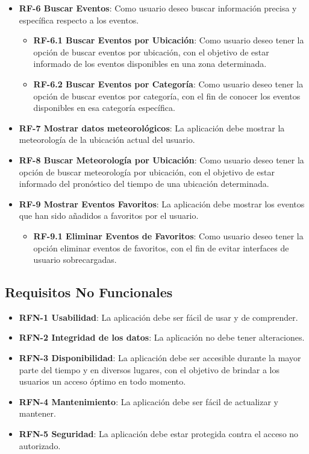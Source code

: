 \begin{itemize}
    \item \textbf{RF-6 Buscar Eventos}: Como usuario deseo buscar información precisa y específica respecto a los eventos.
    \begin{itemize}
        \item  \textbf{RF-6.1 Buscar Eventos por Ubicación}: Como usuario deseo tener la opción de buscar eventos por ubicación, con el objetivo de estar informado de los eventos disponibles en una zona determinada.
        \item  \textbf{RF-6.2 Buscar Eventos por Categoría}: Como usuario deseo tener la opción de buscar eventos por categoría, con el fin de conocer los eventos disponibles en esa categoría específica.
    \end{itemize}
    
    \item \textbf{RF-7 Mostrar datos meteorológicos}: La aplicación debe mostrar la meteorología de la ubicación actual del usuario.
    \item \textbf{RF-8 Buscar Meteorología por Ubicación}: Como usuario deseo tener la opción de buscar meteorología por ubicación, con el objetivo de estar informado del pronóstico del tiempo de una ubicación determinada.
    
    \item \textbf{RF-9 Mostrar Eventos Favoritos}: La aplicación debe mostrar los eventos que han sido añadidos a favoritos por el usuario.
    \begin{itemize}
        \item \textbf{RF-9.1 Eliminar Eventos de Favoritos}: Como usuario deseo tener la opción eliminar eventos de favoritos, con el fin de evitar interfaces de usuario sobrecargadas.
    \end{itemize}
    
\end{itemize}

\subsection{Requisitos No Funcionales}

\begin{itemize}
    \item \textbf{RFN-1 Usabilidad}: La aplicación debe ser fácil de usar y de comprender. 
    \item \textbf{RFN-2 Integridad de los datos}: La aplicación no debe tener alteraciones.
    \item \textbf{RFN-3 Disponibilidad}: La aplicación debe ser accesible durante la mayor parte del tiempo y en diversos lugares, con el objetivo de brindar a los usuarios un acceso óptimo en todo momento.  
    \item \textbf{RFN-4 Mantenimiento}: La aplicación debe ser fácil de actualizar y mantener. 
    \item \textbf{RFN-5 Seguridad}: La aplicación debe estar protegida contra el acceso no autorizado. 
    
\end{itemize}


